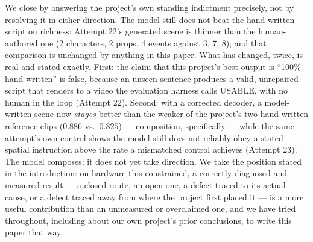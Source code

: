 \documentclass[11pt]{article}
\begin{document}
We close by answering the project's own standing indictment precisely,
not by resolving it in either direction. The model still does not beat
the hand-written script on richness: Attempt 22's generated scene is
thinner than the human-authored one (2 characters, 2 props, 4 events
against 3, 7, 8), and that comparison is unchanged by anything in this
paper. What has changed, twice, is real and stated exactly. First: the
claim that this project's best output is ``100\% hand-written'' is false,
because an unseen sentence produces a valid, unrepaired script that
renders to a video the evaluation harness calls USABLE, with no human in
the loop (Attempt 22). Second: with a corrected decoder, a model-written
scene now \emph{stages} better than the weaker of the project's two
hand-written reference clips ($0.886$ vs.\ $0.825$) --- composition,
specifically --- while the same attempt's own control shows the model
still does not reliably obey a stated spatial instruction above the rate
a mismatched control achieves (Attempt 23). The model composes; it does
not yet take direction. We take the position stated in the introduction:
on hardware this constrained, a correctly diagnosed and measured result
--- a closed route, an open one, a defect traced to its actual cause, or
a defect traced away from where the project first placed it --- is a
more useful contribution than an unmeasured or overclaimed one, and we
have tried throughout, including about our own project's prior
conclusions, to write this paper that way.

\nocite{atd12k,tevet2022mdm}



\end{document}
